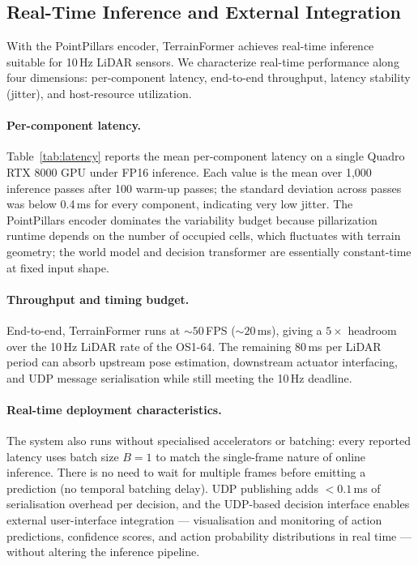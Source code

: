 \documentclass[sensors,article,submit,pdftex,moreauthors]{Definitions/mdpi}
\begin{document}
\subsection{Real-Time Inference and External Integration}
\label{sec:realtime_integration}

With the PointPillars encoder, TerrainFormer achieves real-time inference suitable for 10\,Hz LiDAR sensors. We characterize real-time performance along four dimensions: per-component latency, end-to-end throughput, latency stability (jitter), and host-resource utilization.

\paragraph{Per-component latency.}
Table~\ref{tab:latency} reports the mean per-component latency on a single Quadro RTX 8000 GPU under FP16 inference. Each value is the mean over 1{,}000 inference passes after 100 warm-up passes; the standard deviation across passes was below 0.4\,ms for every component, indicating very low jitter. The PointPillars encoder dominates the variability budget because pillarization runtime depends on the number of occupied cells, which fluctuates with terrain geometry; the world model and decision transformer are essentially constant-time at fixed input shape.

\paragraph{Throughput and timing budget.}
End-to-end, TerrainFormer runs at ${\sim}50$\,FPS (${\sim}20$\,ms), giving a $5\times$ headroom over the 10\,Hz LiDAR rate of the OS1-64. The remaining 80\,ms per LiDAR period can absorb upstream pose estimation, downstream actuator interfacing, and UDP message serialisation while still meeting the 10\,Hz deadline.

\paragraph{Real-time deployment characteristics.}
The system also runs without specialised accelerators or batching: every reported latency uses batch size $B{=}1$ to match the single-frame nature of online inference. There is no need to wait for multiple frames before emitting a prediction (no temporal batching delay). UDP publishing adds $<0.1$\,ms of serialisation overhead per decision, and the UDP-based decision interface enables external user-interface integration --- visualisation and monitoring of action predictions, confidence scores, and action probability distributions in real time --- without altering the inference pipeline.
\end{document}
